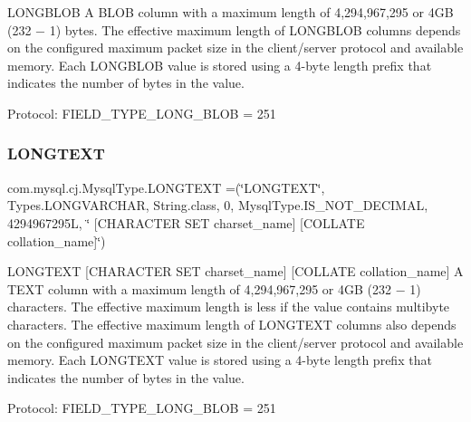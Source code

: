L\+O\+N\+G\+B\+L\+OB A B\+L\+OB column with a maximum length of 4,294,967,295 or 4\+GB (232 − 1) bytes. The effective maximum length of L\+O\+N\+G\+B\+L\+OB columns depends on the configured maximum packet size in the client/server protocol and available memory. Each L\+O\+N\+G\+B\+L\+OB value is stored using a 4-\/byte length prefix that indicates the number of bytes in the value.

Protocol\+: F\+I\+E\+L\+D\+\_\+\+T\+Y\+P\+E\+\_\+\+L\+O\+N\+G\+\_\+\+B\+L\+OB = 251 \mbox{\label{enumcom_1_1mysql_1_1cj_1_1_mysql_type_a2c64c15b3f4f30e58cf638130fa67a07}} 
\subsubsection{\texorpdfstring{L\+O\+N\+G\+T\+E\+XT}{LONGTEXT}}
{\footnotesize\ttfamily com.\+mysql.\+cj.\+Mysql\+Type.\+L\+O\+N\+G\+T\+E\+XT =(\char`\"{}L\+O\+N\+G\+T\+E\+XT\char`\"{}, Types.\+L\+O\+N\+G\+V\+A\+R\+C\+H\+AR, String.\+class, 0, Mysql\+Type.\+I\+S\+\_\+\+N\+O\+T\+\_\+\+D\+E\+C\+I\+M\+AL, 4294967295\+L, \char`\"{} \mbox{[}\+C\+H\+A\+R\+A\+C\+T\+E\+R S\+E\+T charset\+\_\+name\mbox{]} \mbox{[}\+C\+O\+L\+L\+A\+T\+E collation\+\_\+name\mbox{]}\char`\"{})}

L\+O\+N\+G\+T\+E\+XT \mbox{[}C\+H\+A\+R\+A\+C\+T\+ER S\+ET charset\+\_\+name\mbox{]} \mbox{[}C\+O\+L\+L\+A\+TE collation\+\_\+name\mbox{]} A T\+E\+XT column with a maximum length of 4,294,967,295 or 4\+GB (232 − 1) characters. The effective maximum length is less if the value contains multibyte characters. The effective maximum length of L\+O\+N\+G\+T\+E\+XT columns also depends on the configured maximum packet size in the client/server protocol and available memory. Each L\+O\+N\+G\+T\+E\+XT value is stored using a 4-\/byte length prefix that indicates the number of bytes in the value.

Protocol\+: F\+I\+E\+L\+D\+\_\+\+T\+Y\+P\+E\+\_\+\+L\+O\+N\+G\+\_\+\+B\+L\+OB = 251 \mbox{\label{enumcom_1_1mysql_1_1cj_1_1_mysql_type_a7a690573bfaf820db73489978040f19d}} 
